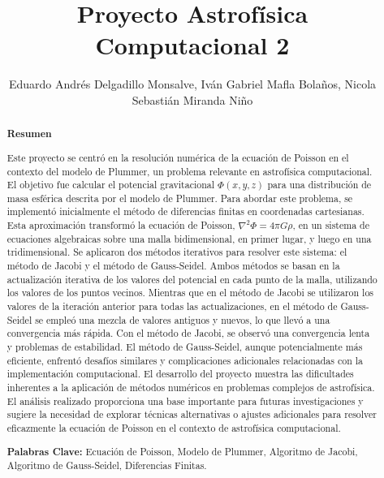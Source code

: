 \documentclass[reprint,amsmath,amssymb,aps]{revtex4-1}
\begin{document}
\footnotesize
{}

\title{Proyecto Astrofísica Computacional 2}

\author{\large Eduardo Andrés Delgadillo Monsalve, Iván Gabriel Mafla Bolaños, Nicola Sebastián Miranda Niño}
\begin{abstract}
\normalsize
\begin{center}\textbf{Resumen}\\
\end{center}
Este proyecto se centró en la resolución numérica de la ecuación de Poisson en el contexto del modelo de Plummer, un problema relevante en astrofísica computacional. El objetivo fue calcular el potencial gravitacional \(\Phi(x, y, z)\) para una distribución de masa esférica descrita por el modelo de Plummer. Para abordar este problema, se implementó inicialmente el método de diferencias finitas en coordenadas cartesianas. Esta aproximación transformó la ecuación de Poisson, \(\nabla^2 \Phi = 4\pi G\rho\), en un sistema de ecuaciones algebraicas sobre una malla bidimensional, en primer lugar, y luego en una tridimensional. Se aplicaron dos métodos iterativos para resolver este sistema: el método de Jacobi y el método de Gauss-Seidel. Ambos métodos se basan en la actualización iterativa de los valores del potencial en cada punto de la malla, utilizando los valores de los puntos vecinos. Mientras que en el método de Jacobi se utilizaron los valores de la iteración anterior para todas las actualizaciones, en el método de Gauss-Seidel se empleó una mezcla de valores antiguos y nuevos, lo que llevó a una convergencia más rápida. Con el método de Jacobi, se observó una convergencia lenta y problemas de estabilidad. El método de Gauss-Seidel, aunque potencialmente más eficiente, enfrentó desafíos similares y complicaciones adicionales relacionadas con la implementación computacional. El desarrollo del proyecto muestra las dificultades inherentes a la aplicación de métodos numéricos en problemas complejos de astrofísica. El análisis realizado proporciona una base importante para futuras investigaciones y sugiere la necesidad de explorar técnicas alternativas o ajustes adicionales para resolver eficazmente la ecuación de Poisson en el contexto de astrofísica computacional.
 
\textbf{Palabras Clave: } Ecuación de Poisson, Modelo de Plummer, Algoritmo de Jacobi, Algoritmo de Gauss-Seidel, Diferencias Finitas. 
\end{abstract}
\maketitle
\end{document}
